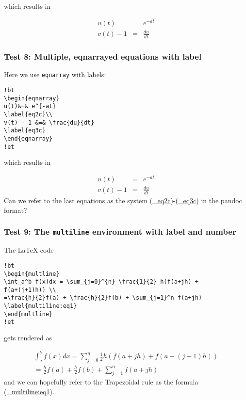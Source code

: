 \documentclass[]{article}
\begin{document}
which results in

\[
\begin{eqnarray*}
u(t)&=& e^{-at}\\ 
v(t) - 1 &=& \frac{du}{dt}
\end{eqnarray*}
\]

\subsubsection{Test 8: Multiple, eqnarrayed equations with
label}\label{test-8-multiple-eqnarrayed-equations-with-label}

Here we use \texttt{eqnarray} with labels:

\begin{verbatim}
!bt
\begin{eqnarray}
u(t)&=& e^{-at}
\label{eq2c}\\ 
v(t) - 1 &=& \frac{du}{dt}
\label{eq3c}
\end{eqnarray}
!et
\end{verbatim}

which results in

\[
\begin{eqnarray}
u(t)&=& e^{-at} \label{_eq2c}\\ 
v(t) - 1 &=& \frac{du}{dt} \label{_eq3c}
\end{eqnarray}
\] Can we refer to the last equations as the system
(\protect\hyperlink{ux5feq2c}{\_eq2c})-(\protect\hyperlink{ux5feq3c}{\_eq3c})
in the pandoc format?

\subsubsection{\texorpdfstring{Test 9: The \texttt{multiline}
environment with label and
number}{Test 9: The multiline environment with label and number}}\label{test-9-the-multiline-environment-with-label-and-number}

The LaTeX code

\begin{verbatim}
!bt
\begin{multline}
\int_a^b f(x)dx = \sum_{j=0}^{n} \frac{1}{2} h(f(a+jh) +
f(a+(j+1)h)) \\ 
=\frac{h}{2}f(a) + \frac{h}{2}f(b) + \sum_{j=1}^n f(a+jh)
\label{multiline:eq1}
\end{multline}
!et
\end{verbatim}

gets rendered as

\[
\begin{multline}
\int_a^b f(x)dx = \sum_{j=0}^{n} \frac{1}{2} h(f(a+jh) +
f(a+(j+1)h)) \\ 
=\frac{h}{2}f(a) + \frac{h}{2}f(b) + \sum_{j=1}^n f(a+jh)
\label{_multiline:eq1}
\end{multline}
\] and we can hopefully refer to the Trapezoidal rule as the formula
(\protect\hyperlink{ux5fmultiline:eq1}{\_multiline:eq1}).
\end{document}
